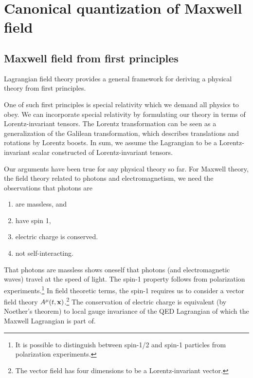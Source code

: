 \section{Canonical quantization of Maxwell field}

\subsection{Maxwell field from first principles}

Lagrangian field theory provides a general framework for deriving a physical theory from first principles.

One of such first principles is special relativity which we demand all physics to obey.
We can incorporate special relativity by formulating our theory in terms of Lorentz-invariant tensors.
The Lorentz transformation can be seen as a generalization of the Galilean transformation, which describes translations and rotations by Lorentz boosts.
In sum, we assume the Lagrangian to be a Lorentz-invariant scalar constructed of Lorentz-invariant tensors.

Our arguments have been true for any physical theory so far.
For Maxwell theory, the field theory related to photons and electromagnetism, we need the observations that photons are
\begin{enumerate}
	\item are massless, and 
	\item have spin 1,
	\item electric charge is conserved.
	\item not self-interacting.
\end{enumerate}
That photons are massless shows oneself that photons (and electromagnetic waves) travel at the speed of light.
The spin-1 property follows from polarization experiments.\footnote{It is possible to distinguish between spin-1/2 and spin-1 particles from polarization experiments.}
In field theoretic terms, the spin-1 requires us to consider a vector field theory $A^\mu(t,\vb{x})$.\footnote{The vector field has four dimensions to be a Lorentz-invariant vector.}
The conservation of electric charge is equivalent (by Noether's theorem) to local gauge invariance of the QED Lagrangian of which the Maxwell Lagrangian is part of.

